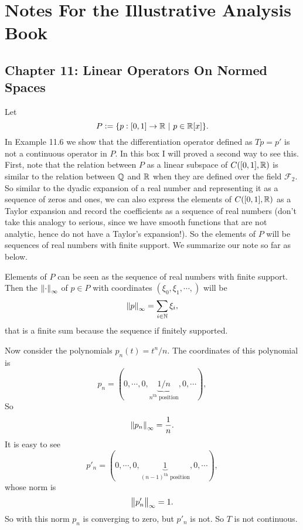 \chapter{Notes For the Illustrative Analysis Book}


\section{Chapter 11: Linear Operators On Normed Spaces}

\begin{observation}
	Let
	\[ P:= \{p:[0,1]\to\mathbb{R}\ |\ p\in \mathbb{R}[x]\}. \]
	In Example 11.6 we show that the differentiation operator defined as $ Tp = p' $ is not a continuous operator in $ P $. In this box I will proved a second way to see this. First, note that the relation between $ P $ as a linear subspace of $ C([0,1],\mathbb{R}) $ is similar to the relation between $ \mathbb{Q} $ and $ \mathbb{R} $ when they are defined over the field $ \mathcal{F}_2 $. So similar to the dyadic expansion of a real number and representing it as a sequence of zeros and ones, we can also express the elements of $ C([0,1],\mathbb{R}) $ as a Taylor expansion and record the coefficients as a sequence of real numbers (don't take this analogy to serious, since we have smooth functions that are not analytic, hence do not have a Taylor's expansion!). So the elements of $ P $ will be sequences of real numbers with finite support. We summarize our note so far as below.
	\begin{summary}
		Elements of $ P $ can be seen as the sequence of real numbers with finite support. Then the $ \norm{\cdot}_{\infty} $ of $ p \in P $ with coordinates $ (\xi_0,\xi_1,\cdots,) $ will be
		\[ \norm{p}_\infty = \sum_{i\in \mathbb{N}} \xi_i, \]
		that is a finite sum because the sequence if finitely supported.
	\end{summary}
	Now consider the polynomials $ p_n(t) = t^n/n $. The coordinates of this polynomial is
	\[ p_n = (0,\cdots,0,\underbrace{1/n}_{n^\text{th}\text{ position}},0,\cdots), \]
	So
	\[ \norm{p_n}_\infty = \frac{1}{n}. \]
	It is easy to see 
	\[ p'_n = (0,\cdots,0,\underbrace{1}_{(n-1)^\text{th}\text{ position}},0,\cdots), \]
	whose norm is
	\[ \norm{p'_n}_\infty = 1. \]
	So with this norm $ p_n $ is converging to zero, but $ p'_n $ is not. So $ T $ is not continuous.
	
\end{observation}

